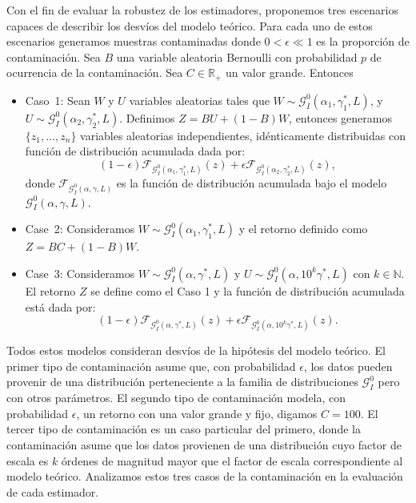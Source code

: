 Con el fin de evaluar la robustez de los estimadores, proponemos tres escenarios capaces de describir los desvíos del modelo teórico. Para cada uno de estos escenarios generamos muestras contaminadas donde $0<\epsilon \ll 1$ es la proporción de contaminación. 
Sea  $B$ una variable aleatoria Bernoulli con probabilidad $p$ de ocurrencia de la contaminación. Sea $C \in \mathbb R_+$ un valor grande. Entonces
\begin{itemize}
	\item \label{ContCaso1}Caso~1:
	Sean $W$ y $U$ variables aleatorias tales que $W \sim \mathcal{G}_I^0(\alpha_1,\gamma_1^*,L)$, y $U \sim \mathcal{G}_I^0(\alpha_2,\gamma_2^*,L) $. Definimos $Z=BU+(1-B)W$, entonces generamos $\{z_1,\dots,z_n\}$ variables aleatorias independientes, idénticamente distribuidas con función de distribución acumulada dada por:
	$$
	(1-\epsilon) \mathcal{F}_{\mathcal{G}_I^0(\alpha_1,\gamma_1^*,L)}(z)+\epsilon\mathcal{F}_{\mathcal{G}_I^0(\alpha_2,\gamma_2^*,L)}(z),
	$$
	donde $\mathcal{F}_{\mathcal{G}_I^0(\alpha,\gamma,L)}$ es la función de distribución acumulada bajo el modelo $\mathcal{G}_I^0(\alpha,\gamma,L)$.
	\item \label{Caso2}Case~2: Consideramos $W \sim \mathcal{G}_I^0(\alpha_1,\gamma_1^*,L)$ y el retorno definido como $Z=BC+(1-B)W$.
	\item \label{Caso3}Case~3:
	Consideramos $W \sim \mathcal{G}_I^0(\alpha,\gamma^*,L)$ y $U\sim \mathcal{G}_I^0(\alpha,10^k\gamma^*,L) $ con $k \in \mathbb{N}$. 
	El retorno $Z$ se define como el Caso 1 y la función de distribución acumulada está dada por: 
	$$
	(1-\epsilon) \mathcal{F}_{\mathcal{G}_I^0(\alpha,\gamma^*,L)}(z)+\epsilon\mathcal{F}_{\mathcal{G}_I^0(\alpha,10^k\gamma^*,L)}(z).
	$$
\end{itemize}

Todos estos modelos consideran desvíos de la hipótesis del modelo teórico. El primer tipo de contaminación asume que, con probabilidad $\epsilon$, los datos pueden provenir de una distribución perteneciente a la familia de distribuciones $\mathcal{G}_I^0$ pero con otros parámetros. El segundo tipo de contaminación modela, con probabilidad $\epsilon$, un retorno con una valor grande y fijo, digamos $C=100$. El tercer tipo de contaminación es un caso particular del primero, donde la contaminación asume que los datos provienen de una distribución cuyo factor de escala es $k$ órdenes de magnitud mayor que el factor de escala correspondiente al modelo teórico. Analizamos estos tres casos de la contaminación en la evaluación de cada estimador.

